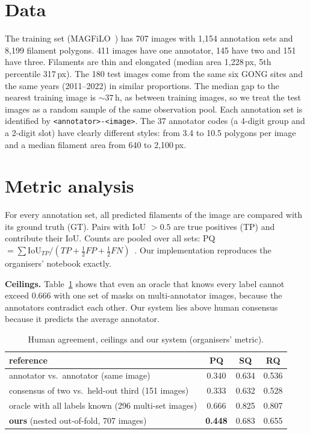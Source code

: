 \section{Data}
The training set (MAGFiLO~\cite{magfilo}) has 707 images with 1{,}154 annotation sets and 8{,}199 filament
polygons. 411 images have one annotator, 145 have two and 151 have three. Filaments are thin and elongated (median
area 1{,}228\,px, 5th percentile 317\,px). The 180 test images come from the same six GONG sites and the same years
(2011--2022) in similar proportions. The median gap to the nearest training image is ${\sim}37$\,h, as between
training images, so we treat the test images as a random sample of the same observation pool. Each annotation set
is identified by \texttt{<annotator>-<image>}. The 37 annotator codes (a 4-digit group and a 2-digit slot) have
clearly different styles: from 3.4 to 10.5 polygons per image and a median filament area from 640 to 2{,}100\,px.

\section{Metric analysis}
For every annotation set, all predicted filaments of the image are compared with its ground truth (GT). Pairs with
IoU $>0.5$ are true positives (TP) and contribute their IoU. Counts are pooled over all sets:
PQ $=\sum \mathrm{IoU}_{TP}/(TP+\tfrac12 FP+\tfrac12 FN)$~\cite{kirillov2019panoptic}. Our implementation reproduces
the organisers' notebook exactly.

\textbf{Ceilings.} Table~\ref{tab:ceil} shows that even an oracle that knows every label cannot exceed 0.666 with
one set of masks on multi-annotator images, because the annotators contradict each other. Our system lies above
human consensus because it predicts the average annotator.

\begin{table}[t]
\caption{Human agreement, ceilings and our system (organisers' metric).}\label{tab:ceil}
\centering\footnotesize
\begin{tabular}{@{}lccc@{}}
\toprule
reference & PQ & SQ & RQ \\
\midrule
annotator vs.\ annotator (same image) & 0.340 & 0.634 & 0.536 \\
consensus of two vs.\ held-out third (151 images) & 0.333 & 0.632 & 0.528 \\
oracle with all labels known (296 multi-set images) & 0.666 & 0.825 & 0.807 \\
\textbf{ours} (nested out-of-fold, 707 images) & \textbf{0.448} & 0.683 & 0.655 \\
\bottomrule
\end{tabular}
\end{table}

